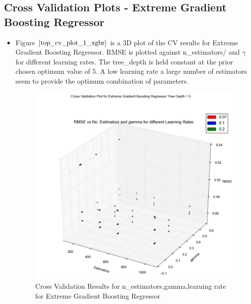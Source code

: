 \documentclass[twoside,12pt]{article}
\begin{document}
\subsection{Cross Validation Plots - Extreme Gradient Boosting Regressor}
\begin{itemize}
\item
Figure $\eqref{top_cv_plot_1_xgbr}$ is a 3D plot of the CV results for Extreme Gradient Boosting Regressor. RMSE is plotted against n\_estimators/ and $\gamma$ for different learning rates. The tree\_depth is held constant at the prior chosen optimum value of 5. A low learning rate a large number of estimators seem to provide the optimum combination of parameters.
\begin{figure}[!htbp]
	\centering
	\includegraphics[scale=.43]{DataVisualization/3dplot_xgbr.png} 
	\caption{Cross Validation Results for n\_estimators,gamma,learning rate for Extreme Gradient Boosting Regressor}
	\label{top_cv_plot_1_xgbr}
\end{figure}



\end{itemize}
\end{document}
